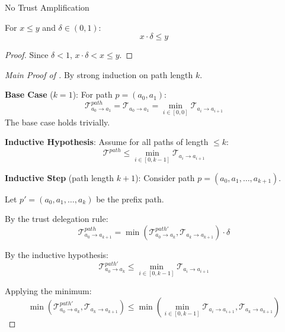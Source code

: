 \documentclass[
  ignorenonframetext,
]{beamer}
\providecommand{\cref}[1]{\texttt{\detokenize{#1}}}
\begin{document}
\begin{frame}[allowframebreaks]{No Trust Amplification}
\begin{lemma}
\label{lem:decay-strengthens}
For $x \leq y$ and $\delta \in (0,1)$:
\begin{equation}
\label{eq:decay-strengthens}
x \cdot \delta \leq y
\end{equation}
\end{lemma}

\begin{proof}
Since $\delta < 1$, $x \cdot \delta < x \leq y$.
\end{proof}

\begin{proof}[Main Proof of \cref{thm:trust-amp-restated}]
By strong induction on path length $k$.

\textbf{Base Case} ($k = 1$): For path $p = (a_0, a_1)$:
\begin{equation}
\label{eq:62-base}
\mathcal{T}_{a_0 \to a_1}^{path} = \mathcal{T}_{a_0 \to a_1} = \min_{i \in [0,0]} \mathcal{T}_{a_i \to a_{i+1}}
\end{equation}
The base case holds trivially.

\textbf{Inductive Hypothesis}: Assume for all paths of length $\leq k$:
\begin{equation}
\label{eq:62-ind-hyp}
\mathcal{T}^{path} \leq \min_{i \in [0,k-1]} \mathcal{T}_{a_i \to a_{i+1}}
\end{equation}

\textbf{Inductive Step} (path length $k + 1$): Consider path $p = (a_0, a_1, \ldots, a_{k+1})$.

Let $p' = (a_0, a_1, \ldots, a_k)$ be the prefix path.

By the trust delegation rule:
\begin{equation}
\label{eq:62-step-1}
\mathcal{T}_{a_0 \to a_{k+1}}^{path} = \min(\mathcal{T}_{a_0 \to a_k}^{path'}, \mathcal{T}_{a_k \to a_{k+1}}) \cdot \delta
\end{equation}

By the inductive hypothesis:
\begin{equation}
\label{eq:62-step-2}
\mathcal{T}_{a_0 \to a_k}^{path'} \leq \min_{i \in [0,k-1]} \mathcal{T}_{a_i \to a_{i+1}}
\end{equation}

Applying the minimum:
\begin{equation}
\label{eq:62-step-3}
\min(\mathcal{T}_{a_0 \to a_k}^{path'}, \mathcal{T}_{a_k \to a_{k+1}}) \leq \min\left(\min_{i \in [0,k-1]} \mathcal{T}_{a_i \to a_{i+1}}, \mathcal{T}_{a_k \to a_{k+1}}\right)
\end{equation}


\end{proof}
\end{frame}
\end{document}
